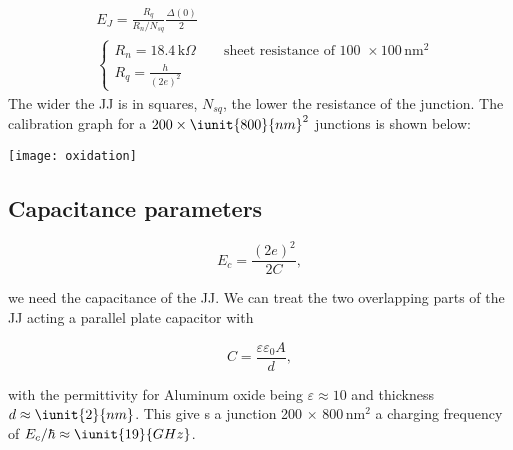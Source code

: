  \begin{framed}\noindent
   \begin{equation}\label{eq:fabrication_jj_2}
     \begin{aligned}
       & E_J = \frac{R_q}{R_n/N_{sq}}\frac{\Delta(0)}{2}\\
       & \begin{cases}
         R_n = 18.4\,\text{k}\Omega \qquad \text{sheet resistance of 100 } \times 100\,\text{nm}^{2}\\
         R_q = \frac{h}{(2e)^2}
       \end{cases}
     \end{aligned}
   \end{equation}
   \noindent The wider the JJ is in  squares, $ N_{sq} $, the lower the
   resistance   of  the   junction.   The   calibration  graph   for  a
   $ 200 \times \iunit{800}{nm}^2 $ junctions is shown below:

   \texttt{[image: oxidation]}

 \end{framed}





 \subsection{Capacitance parameters}
 \label{sec:capac-param}

\begin{equation}\label{eqn:sim_1}
  E_c = \frac{(2e)^2}{2C},
\end{equation}

\noindent  we need  the capacitance  of the  JJ. We  can treat  the two
overlapping parts of the JJ acting a parallel plate capacitor with

\begin{framed}\noindent
  \begin{equation}\label{key}
    C = \frac{\varepsilon\varepsilon_0A}{d},
  \end{equation}

  \noindent   with   the   permittivity  for   Aluminum   oxide   being
  $ \varepsilon \approx 10 $ and thickness $ d \approx \iunit{2}{nm} $.
  This  give s  a  junction 200  $ \times  $  800\,nm$^{2}$ a  charging
  frequency of $ E_c/\hbar \approx\iunit{19}{GHz} $.
\end{framed}

